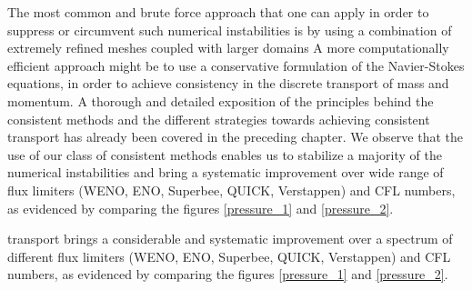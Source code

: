 The most common and brute force approach that one can apply 
in order to suppress or circumvent such numerical instabilities is 
by using a combination of extremely refined meshes coupled with larger domains
A more computationally efficient approach might be to use a 
conservative formulation
of the Navier-Stokes equations, in order
to achieve consistency in the discrete transport of mass and momentum. 
A thorough and detailed exposition of the principles
behind the consistent methods and the different strategies towards achieving consistent
transport has already been covered in the preceding chapter.  
We observe that the use of our class of consistent methods 
enables us to stabilize a majority of the numerical
instabilities and bring a systematic improvement over wide range of 
flux limiters (WENO, ENO, Superbee, QUICK, Verstappen) 
and CFL numbers, as evidenced by comparing the figures \ref{pressure_1} and \ref{pressure_2}. 

transport brings a considerable and systematic improvement over a 
spectrum of different flux limiters (WENO, ENO, Superbee, QUICK, Verstappen) 
and CFL numbers, as evidenced by comparing the figures \ref{pressure_1} and \ref{pressure_2}. 

